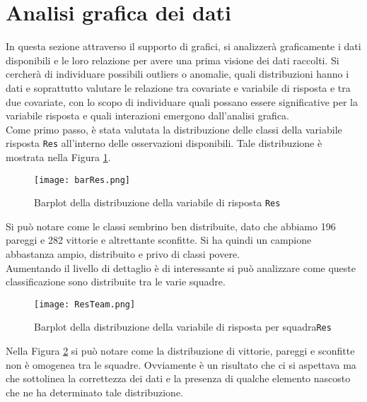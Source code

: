 \section{Analisi grafica dei dati}
In questa sezione attraverso il supporto di grafici, si analizzerà graficamente i dati disponibili e le loro relazione per avere una prima visione dei dati raccolti. Si cercherà di individuare possibili outliers o anomalie, quali distribuzioni hanno i dati e soprattutto valutare le relazione tra covariate e variabile di risposta e tra due covariate, con lo scopo di individuare quali possano essere significative per la variabile risposta e quali interazioni emergono dall'analisi grafica.\\

Come primo passo, è stata valutata la distribuzione delle classi della variabile risposta \texttt{Res} all'interno delle osservazioni disponibili. Tale distribuzione è mostrata nella Figura \ref{fig:res}.

\begin{figure}[htbp]
	\begin{center}
		\texttt{[image: barRes.png]}
		\caption{Barplot della distribuzione della variabile di risposta \texttt{Res}} \label{fig:res}
	\end{center}
\end{figure}

Si può notare come le classi sembrino ben distribuite, dato che abbiamo 196 pareggi e 282 vittorie e altrettante sconfitte. Si ha quindi un campione abbastanza ampio, distribuito e privo di classi povere.\\

Aumentando il livello di dettaglio è di interessante si può analizzare come queste classificazione sono distribuite tra le varie squadre. %

\begin{figure}[htbp]
	\begin{center}
		\texttt{[image: ResTeam.png]}
		\caption{Barplot della distribuzione della variabile di risposta per squadra\texttt{Res}} \label{fig:team}
	\end{center}
\end{figure}

Nella Figura \ref{fig:team} si può notare come la distribuzione di vittorie, pareggi e sconfitte non è omogenea tra le squadre. Ovviamente è un risultato che ci si aspettava ma che sottolinea la correttezza dei dati e la presenza di qualche elemento nascosto che ne ha determinato tale distribuzione.\\

